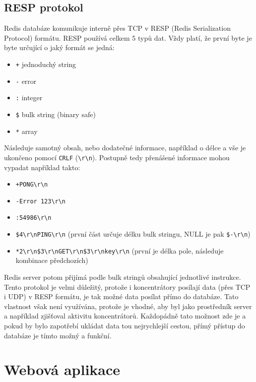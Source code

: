 \subsection{RESP protokol}
Redis databáze komunikuje interně přes TCP v RESP (Redis Serialization Protocol) formátu. RESP používá celkem 5 typů dat. Vždy platí, že první byte je byte určující o jaký formát se jedná:

\begin{itemize}
\itemsep0em
\item \texttt{+} jednoduchý string
\item \texttt{-} error
\item \texttt{:} integer
\item \texttt{\$} bulk string (binary safe)
\item \texttt{*} array
\end{itemize}

Následuje samotný obsah, nebo dodatečné informace, například o délce a vše je ukončeno pomocí \texttt{CRLF} (\texttt{\textbackslash r\textbackslash n}). Postupně tedy přenášené informace mohou vypadat například takto:

\begin{itemize}
\itemsep0em
\item \texttt{+PONG\textbackslash r\textbackslash n}
\item \texttt{-Error 123\textbackslash r\textbackslash n}
\item \texttt{:54986\textbackslash r\textbackslash n}
\item \texttt{\$4\textbackslash r\textbackslash nPING\textbackslash r\textbackslash n} (první část určuje délku bulk stringu, NULL je pak \texttt{\$-\textbackslash r\textbackslash n})
\item \texttt{*2\textbackslash r\textbackslash n\$3\textbackslash r\textbackslash nGET\textbackslash r\textbackslash n\$3\textbackslash r\textbackslash nkey\textbackslash r\textbackslash n} (první je délka pole, následuje kombinace předchozích)
\end{itemize}

Redis server potom přijímá podle bulk stringů obsahující jednotlivé instrukce. Tento protokol je velmi důležitý, protože i koncentrátory posílají data (přes TCP i UDP) v RESP formátu, je tak možné data posílat přímo do databáze. Tato vlastnost však není využívána, protože je vhodné, aby byl jako prostředník server a například zjišťoval aktivitu koncentrátorů. Každopádně tato možnost zde je a pokud by bylo zapotřebí ukládat data tou nejrychlejší cestou, přímý přístup do databáze je tímto možný a funkční.

\section{Webová aplikace}
